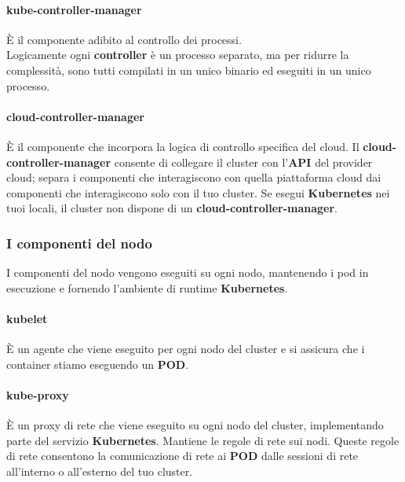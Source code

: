 \documentclass{article}
\begin{document}
\paragraph{kube-controller-manager}
È il componente adibito al controllo dei processi. \\
Logicamente ogni \textbf{controller} è un processo separato, ma per ridurre la complessità, sono tutti compilati in un unico binario ed eseguiti in un unico processo.
\paragraph{cloud-controller-manager}
È il componente che incorpora la logica di controllo specifica del cloud. Il \textbf{cloud-controller-manager} consente di collegare il cluster con l'\textbf{API} del provider cloud; separa i componenti che interagiscono con quella piattaforma cloud dai componenti che interagiscono solo con il tuo cluster. Se esegui \textbf{Kubernetes} nei tuoi locali, il cluster non dispone di un \textbf{cloud-controller-manager}.
\subsubsection{I componenti del nodo}
I componenti del nodo vengono eseguiti su ogni nodo, mantenendo i pod in esecuzione e fornendo l'ambiente di runtime \textbf{Kubernetes}.
\paragraph{kubelet}
È un agente che viene eseguito per ogni nodo del cluster e si assicura che i container stiamo eseguendo un \textbf{POD}.
\paragraph{kube-proxy} È un proxy di rete che viene eseguito su ogni nodo del cluster, implementando parte del servizio \textbf{Kubernetes}. Mantiene le regole di rete sui nodi. Queste regole di rete consentono la comunicazione di rete ai \textbf{POD} dalle sessioni di rete all'interno o all'esterno del tuo cluster.
\end{document}
